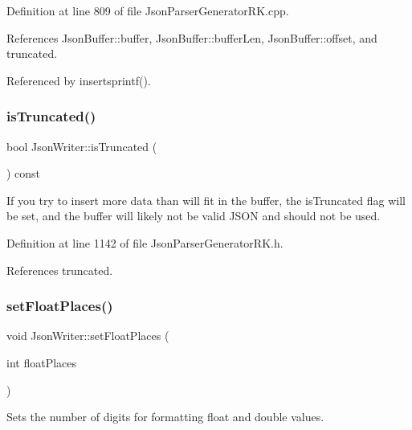 Definition at line 809 of file Json\+Parser\+Generator\+R\+K.\+cpp.



References Json\+Buffer\+::buffer, Json\+Buffer\+::buffer\+Len, Json\+Buffer\+::offset, and truncated.



Referenced by insertsprintf().

\mbox{\label{class_json_writer_a815f77b2db3315bfd40dfb61f68b0ed4}} 
\subsubsection{\texorpdfstring{is\+Truncated()}{isTruncated()}}
{\footnotesize\ttfamily bool Json\+Writer\+::is\+Truncated (\begin{DoxyParamCaption}{ }\end{DoxyParamCaption}) const\hspace{0.3cm}{\ttfamily [inline]}}

If you try to insert more data than will fit in the buffer, the is\+Truncated flag will be set, and the buffer will likely not be valid J\+S\+ON and should not be used. 

Definition at line 1142 of file Json\+Parser\+Generator\+R\+K.\+h.



References truncated.

\mbox{\label{class_json_writer_aecd4d984a49fe59b0c4d892fe6d1e791}} 
\subsubsection{\texorpdfstring{set\+Float\+Places()}{setFloatPlaces()}}
{\footnotesize\ttfamily void Json\+Writer\+::set\+Float\+Places (\begin{DoxyParamCaption}\item[{int}]{float\+Places }\end{DoxyParamCaption})\hspace{0.3cm}{\ttfamily [inline]}}



Sets the number of digits for formatting float and double values. 


